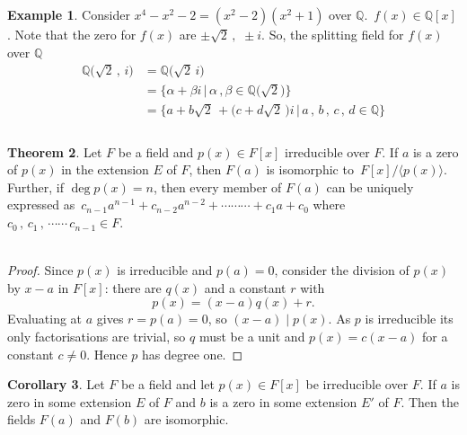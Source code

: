 \documentclass[11pt,a4paper]{article}
\theoremstyle{definition}
\newtheorem{thm}{Theorem}[subsection]
\newtheorem{exa}[thm]{Example}
\newtheorem{coro}[thm]{Corollary}
\begin{document}
\begin{exa}
Consider $x^4 - x^2  - 2 = (x^2 - 2)(x^2 + 1)$ over $\mathbb{Q}$. $\, f(x)\in \mathbb{Q}[x]$. Note that the zero for $f(x)$ are $\pm \sqrt{2}\, ,\,\, \pm i$. So, the splitting field for $f(x)$ over $\mathbb{Q}$
\begin{align*}
\mathbb{Q}\big(\sqrt{2}\, , \, i\big) & = \mathbb{Q}\big(\sqrt{2}\, i\big)\\
                                      & = \big\{\alpha + \beta i\, \big|\, \alpha\, , \beta \in \mathbb{Q}\big(\sqrt{2}\big)\big\}\\
                                      & = \big\{a + b\sqrt{2}\, + \big(c + d\sqrt{2}\,\big)i\,\big|\, a\, , \, b\, , \, c\, , \, d\in \mathbb{Q}\big\}\\\\
\end{align*}
\end{exa}







\begin{thm}
Let $F$ be a field and $p(x)\in F[x]$ irreducible over $F$. If $a$ is a zero of $p(x)$ in the extension $E$ of $F$, then $F(a)$ is isomorphic to $\, F[x]\big/\langle p(x)\rangle$. Further, if $\deg p(x) = n$, then every member of $F(a)$ can be uniquely expressed as $\, c_{n-1} a^{n-1} + c_{n-2} a^{n-2} + \cdots\cdots\cdots + c_1 a + c_0$ where $c_0\, ,\, c_1\, ,\, \cdots\cdots\, c_{n-1} \in F$.\\\\
\end{thm}

\begin{proof}
Since $p(x)$ is irreducible and $p(a)=0$, consider the division of $p(x)$ by
$x-a$ in $F[x]$: there are $q(x)$ and a constant $r$ with
$$p(x) = (x-a)q(x) + r .$$
Evaluating at $a$ gives $r = p(a) = 0$, so $(x-a)\mid p(x)$. As $p$ is
irreducible its only factorisations are trivial, so $q$ must be a unit and
$p(x) = c(x-a)$ for a constant $c\neq0$. Hence $p$ has degree one.
\end{proof}





\begin{coro}
Let $F$ be a field and let $p(x) \in F[x]$ be irreducible over $F$. If $a$ is zero in some extension $E$ of $F$ and $b$ is a zero in some extension $E'$ of $F$. Then the fields $F(a)$ and $F(b)$ are isomorphic.\\
\end{coro}
\end{document}
